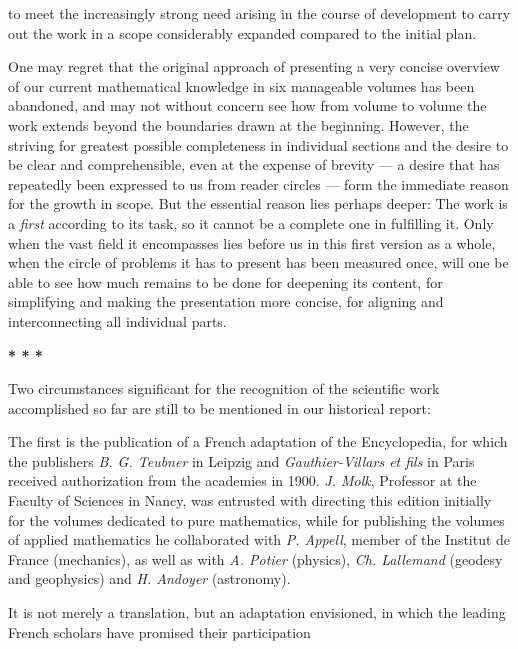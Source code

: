 \thispagestyle{fancy}

\vspace{0.5cm}

to meet the increasingly strong need arising in the course of development to carry out the work in a scope considerably expanded compared to the initial plan.

One may regret that the original approach of presenting a very concise overview of our current mathematical knowledge in six manageable volumes has been abandoned, and may not without concern see how from volume to volume the work extends beyond the boundaries drawn at the beginning. However, the striving for greatest possible completeness in individual sections and the desire to be clear and comprehensible, even at the expense of brevity — a desire that has repeatedly been expressed to us from reader circles — form the immediate reason for the growth in scope. But the essential reason lies perhaps deeper: The work is a \textit{first} according to its task, so it cannot be a complete one in fulfilling it. Only when the vast field it encompasses lies before us in this first version as a whole, when the circle of problems it has to present has been measured once, will one be able to see how much remains to be done for deepening its content, for simplifying and making the presentation more concise, for aligning and interconnecting all individual parts.

\vspace{0.5cm}
\centerline{\textbf{* * *}}
\vspace{0.5cm}

Two circumstances significant for the recognition of the scientific work accomplished so far are still to be mentioned in our historical report:

The first is the publication of a French adaptation of the Encyclopedia, for which the publishers \textit{B. G. Teubner} in Leipzig and \textit{Gauthier-Villars et fils} in Paris received authorization from the academies in 1900. \textit{J. Molk}, Professor at the Faculty of Sciences in Nancy, was entrusted with directing this edition initially for the volumes dedicated to pure mathematics, while for publishing the volumes of applied mathematics he collaborated with \textit{P. Appell}, member of the Institut de France (mechanics), as well as with \textit{A. Potier} (physics), \textit{Ch. Lallemand} (geodesy and geophysics) and \textit{H. Andoyer} (astronomy).

It is not merely a translation, but an adaptation envisioned, in which the leading French scholars have promised their participation
